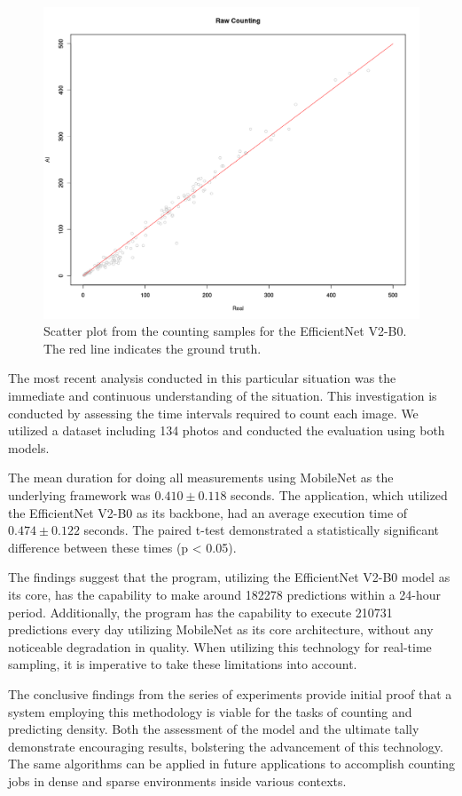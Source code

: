 \begin{figure}[h!]
    \centering
    \includegraphics[width = .7\linewidth]{Figures/ENV2B0.png}
    \caption{Scatter plot from the counting samples for the EfficientNet V2-B0. The red line indicates the ground truth.}
    \label{fig:en-plot}
\end{figure}

The most recent analysis conducted in this particular situation was the immediate and continuous understanding of the situation. This investigation is conducted by assessing the time intervals required to count each image. We utilized a dataset including 134 photos and conducted the evaluation using both models. 

The mean duration for doing all measurements using MobileNet as the underlying framework was $0.410 \pm 0.118$ seconds. The application, which utilized the EfficientNet V2-B0 as its backbone, had an average execution time of $0.474 \pm 0.122$ seconds. The paired t-test demonstrated a statistically significant difference between these times (p < 0.05).

The findings suggest that the program, utilizing the EfficientNet V2-B0 model as its core, has the capability to make around 182278 predictions within a 24-hour period. Additionally, the program has the capability to execute 210731 predictions every day utilizing MobileNet as its core architecture, without any noticeable degradation in quality. When utilizing this technology for real-time sampling, it is imperative to take these limitations into account. 

The conclusive findings from the series of experiments provide initial proof that a system employing this methodology is viable for the tasks of counting and predicting density. Both the assessment of the model and the ultimate tally demonstrate encouraging results, bolstering the advancement of this technology. The same algorithms can be applied in future applications to accomplish counting jobs in dense and sparse environments inside various contexts.

